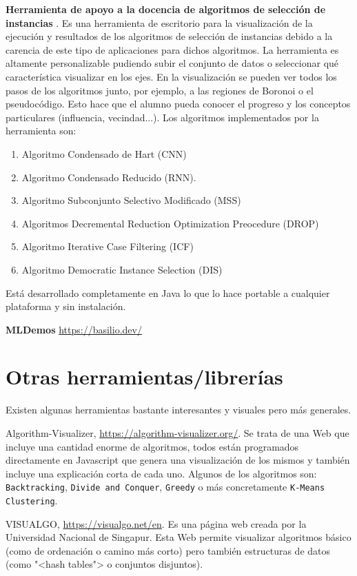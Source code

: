 \textbf{Herramienta de apoyo a la docencia de algoritmos de selección de instancias}
\cite{arnaiz2012herramienta}. Es una herramienta de escritorio para la
visualización de la ejecución y resultados de los algoritmos de selección de
instancias debido a la carencia de este tipo de aplicaciones para dichos
algoritmos. La herramienta es altamente personalizable pudiendo subir el
conjunto de datos o seleccionar qué característica visualizar en los ejes. En la
visualización se pueden ver todos los pasos de los algoritmos junto, por
ejemplo, a las regiones de Boronoi o el pseudocódigo. Esto hace que el alumno
pueda conocer el progreso y los conceptos particulares (influencia, vecindad...). Los
algoritmos implementados por la herramienta son:
\begin{enumerate}
    \item Algoritmo Condensado de Hart (CNN)
    \item Algoritmo Condensado Reducido (RNN).
    \item Algoritmo Subconjunto Selectivo Modificado (MSS)
    \item Algoritmos Decremental Reduction Optimization Preocedure (DROP)
    \item Algoritmo Iterative Case Filtering (ICF)
    \item Algoritmo Democratic Instance Selection (DIS)
\end{enumerate}
Está desarrollado completamente en Java lo que lo hace portable a cualquier
plataforma y sin instalación.

\textbf{MLDemos} \url{https://basilio.dev/}

\section{Otras herramientas/librerías}
Existen algunas herramientas bastante interesantes y visuales pero más generales.

Algorithm-Visualizer, \url{https://algorithm-visualizer.org/}. Se trata de una
Web que incluye una cantidad enorme de algoritmos, todos están programados
directamente en Javascript que genera una visualización de los mismos y también
incluye una explicación corta de cada uno. Algunos de los algoritmos son:
\texttt{Backtracking}, \texttt{Divide and Conquer}, \texttt{Greedy} o más
concretamente \texttt{K-Means Clustering}.

VISUALGO, \url{https://visualgo.net/en}. Es una página web creada por la
Universidad Nacional de Singapur. Esta Web permite visualizar algoritmos básico
(como de ordenación o camino más corto) pero también estructuras de datos (como
"<hash tables"> o conjuntos disjuntos).

